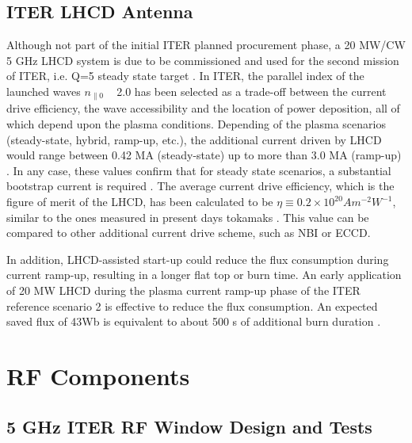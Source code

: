 \subsection{ITER LHCD Antenna}
Although not part of the initial ITER planned procurement phase, a 20 MW/CW 5 GHz LHCD system is due to be commissioned and used for the second mission of ITER, i.e. Q=5 steady state target . In ITER, the parallel index of the launched waves $n_{\parallel 0}$ ~ 2.0 has been selected as a trade-off between the current drive efficiency, the wave accessibility and the location of power deposition, all of which depend upon the plasma conditions. Depending of the plasma scenarios (steady-state, hybrid, ramp-up, etc.), the additional current driven by LHCD would range between 0.42 MA (steady-state) up to more than 3.0 MA (ramp-up) . In any case, these values confirm that for steady state scenarios, a substantial bootstrap current is required . The average current drive efficiency, which is the figure of merit of the LHCD, has been calculated to be $\eta \equiv 0.2 \times 10^{20} A m^{-2} W^{-1}$, similar to the ones measured in present days tokamaks . This value can be compared to other additional current drive scheme, such as NBI or ECCD. 

In addition, LHCD-assisted start-up could reduce the flux consumption during current ramp-up, resulting in a longer flat top or burn time. An early application of 20 MW LHCD during the plasma current ramp-up phase of the ITER reference scenario 2 is effective to reduce the flux consumption. An expected saved flux of 43Wb is equivalent to about 500 s of additional burn duration .






\section{RF Components}\label{sec:RF_components}

\subsection{5 GHz ITER RF Window Design and Tests}\label{sec:RF_windows}

